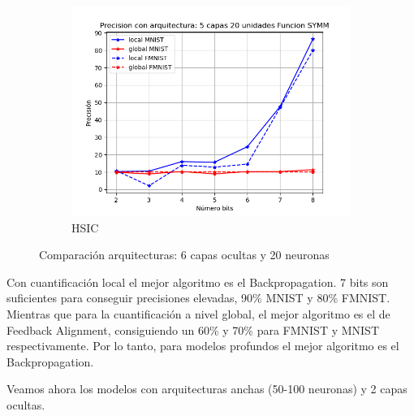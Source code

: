 \begin{figure}[H]
\begin{subfigure}[H]{0.475\textwidth}
    \includegraphics[width=\textwidth]{imagenes/HSIC/Precision con arquitectura: 5 capas 20 unidades Funcion SYMM.png}
    \caption{HSIC}
    \end{subfigure}
    \caption{Comparación arquitecturas: 6 capas ocultas y 20 neuronas}
\end{figure}

Con cuantificación local el mejor algoritmo es el Backpropagation. 7 bits son suficientes para conseguir precisiones elevadas, 90\% MNIST y 80\% FMNIST. Mientras que para la cuantificación a nivel global, el mejor algoritmo es el de Feedback Alignment, consiguiendo un 60\% y 70\% para FMNIST y MNIST respectivamente. Por lo tanto, para modelos profundos el mejor algoritmo es el Backpropagation.

Veamos ahora los modelos con arquitecturas anchas (50-100 neuronas) y 2 capas ocultas. 

